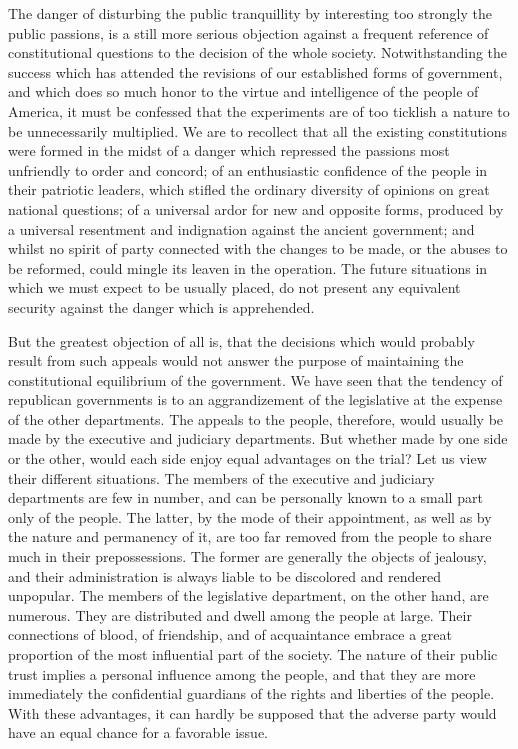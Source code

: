 The danger of disturbing the public tranquillity by interesting too strongly the public passions, is a still more serious objection against a frequent reference of constitutional questions to the decision of the whole society. Notwithstanding the success which has attended the revisions of our established forms of government, and which does so much honor to the virtue and intelligence of the people of America, it must be confessed that the experiments are of too ticklish a nature to be unnecessarily multiplied. We are to recollect that all the existing constitutions were formed in the midst of a danger which repressed the passions most unfriendly to order and concord; of an enthusiastic confidence of the people in their patriotic leaders, which stifled the ordinary diversity of opinions on great national questions; of a universal ardor for new and opposite forms, produced by a universal resentment and indignation against the ancient government; and whilst no spirit of party connected with the changes to be made, or the abuses to be reformed, could mingle its leaven in the operation. The future situations in which we must expect to be usually placed, do not present any equivalent security against the danger which is apprehended.

But the greatest objection of all is, that the decisions which would probably result from such appeals would not answer the purpose of maintaining the constitutional equilibrium of the government. We have seen that the tendency of republican governments is to an aggrandizement of the legislative at the expense of the other departments. The appeals to the people, therefore, would usually be made by the executive and judiciary departments. But whether made by one side or the other, would each side enjoy equal advantages on the trial? Let us view their different situations. The members of the executive and judiciary departments are few in number, and can be personally known to a small part only of the people. The latter, by the mode of their appointment, as well as by the nature and permanency of it, are too far removed from the people to share much in their prepossessions. The former are generally the objects of jealousy, and their administration is always liable to be discolored and rendered unpopular. The members of the legislative department, on the other hand, are numerous. They are distributed and dwell among the people at large. Their connections of blood, of friendship, and of acquaintance embrace a great proportion of the most influential part of the society. The nature of their public trust implies a personal influence among the people, and that they are more immediately the confidential guardians of the rights and liberties of the people. With these advantages, it can hardly be supposed that the adverse party would have an equal chance for a favorable issue.


